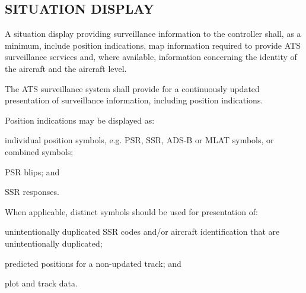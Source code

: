 \subsection[Situation display]{SITUATION DISPLAY}

\begin{enumnoss}
    \item A situation display providing surveillance information to the controller shall, as a minimum, include position indications, map information required to provide ATS surveillance services and, where available, information concerning the identity of the aircraft and the aircraft level.
    \item The ATS surveillance system shall provide for a continuously updated presentation of surveillance information, including position indications.
    \item Position indications may be displayed as:

    \begin{enumalph}
        \item individual position symbols, e.g. PSR, SSR, ADS-B or MLAT symbols, or combined symbols;
        \item PSR blips; and
        \item SSR responses.
    \end{enumalph}

    \item When applicable, distinct symbols should be used for presentation of:

    \begin{enumalph}
        \item unintentionally duplicated SSR codes and/or aircraft identification that are unintentionally duplicated;
        \item predicted positions for a non-updated track; and
        \item plot and track data.
    \end{enumalph}


\end{enumnoss}
